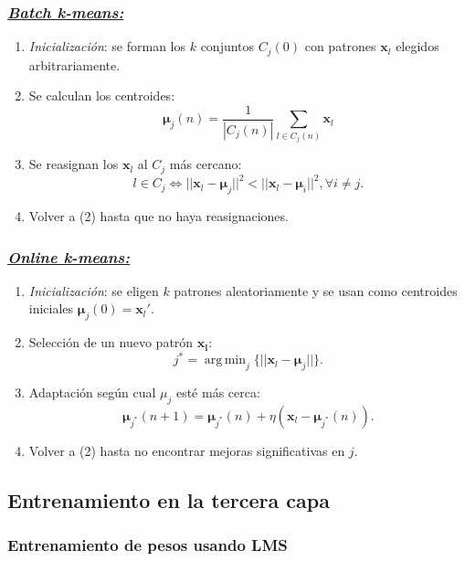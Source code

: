 \documentclass[10pt,a4paper]{article}
\DeclareMathOperator*{\argmin}{arg\,\min}
\begin{document}
\begin{multicols}{2}

\subsubsection*{\underline{\textit{Batch k-means:}}}
\begin{enumerate}
\item \textit{Inicialización}: se forman los $k$ conjuntos $C_j(0)$ con patrones $\mathbf{x}_l$ elegidos arbitrariamente.
\item Se calculan los centroides:
\[\mathbf{\mu}_j(n) = \frac{1}{|C_j(n)|}\sum_{l\in C_j(n)} \mathbf{x}_l\]
\item Se reasignan los $\mathbf{x}_l$ al $C_j$ más cercano:
\[ l \in C_j \iff ||\mathbf{x}_l -\mathbf{\mu}_j||^2 < ||\mathbf{x}_l -\mathbf{\mu}_i||^2, \forall i\neq j.\]
\item Volver a (2) hasta que no haya reasignaciones.
\end{enumerate}

\subsubsection*{\underline{\textit{Online k-means:}}}
\begin{enumerate}
\item \textit{Inicialización}: se eligen $k$ patrones aleatoriamente y se usan como centroides iniciales $\mathbf{\mu}_j(0)=\mathbf{x}_{l}'$.
\item Selección de un nuevo patrón $\mathbf{x_l}$: 
\[j^* = \argmin_j \{||\mathbf{x}_l-\mathbf{\mu}_j||\}.\]
\item Adaptación según cual $\mu_j$ esté más cerca: 
\[\mathbf{\mu}_{j^*}(n+1)=\mathbf{\mu}_{j^*}(n)+\eta(\mathbf{x}_l-\mathbf{\mu}_{j^*}(n)).\]
\item Volver a (2) hasta no encontrar mejoras significativas en $j$.
\end{enumerate}

\end{multicols}

\subsection{Entrenamiento en la tercera capa}

\subsubsection{Entrenamiento de pesos usando LMS}
\end{document}
